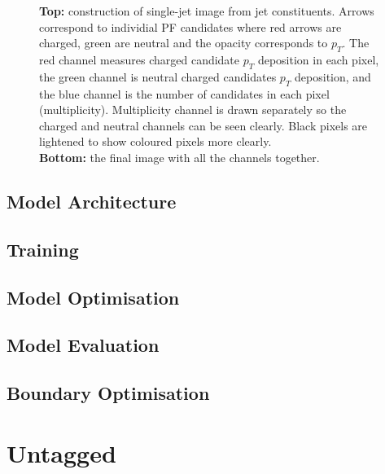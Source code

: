 \begin{figure}[h!]
    \caption{\textbf{Top:} construction of single-jet image from jet constituents. Arrows correspond to individial PF candidates where red arrows are charged, green are neutral and the opacity corresponds to $p_{T}$.
             The red channel measures charged candidate $p_T$ deposition in each pixel, 
             the green channel is neutral charged candidates $p_T$ deposition, 
             and the blue channel is the number of candidates in each pixel (multiplicity). 
             Multiplicity channel is drawn separately so the charged and neutral channels can be seen clearly. Black pixels are lightened to show coloured pixels more clearly.\\
             \textbf{Bottom:} the final image with all the channels together.}
        \label{fig:event_categorisatoin:jet_image}
\end{figure}


\subsection{Model Architecture}
\subsection{Training}
\subsection{Model Optimisation}
\subsection{Model Evaluation}
\subsection{Boundary Optimisation}

\section{Untagged}
